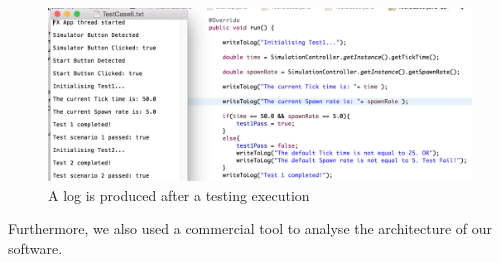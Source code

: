\begin{figure}[h]
	\begin{center}
		\includegraphics[width=\textwidth]{img/testingCase.png}
		\caption{A log is produced after a testing execution}
		\label{fig:testingCase}
	\end{center}
\end{figure}

Furthermore, we also used a commercial tool to analyse the architecture of our software.  




